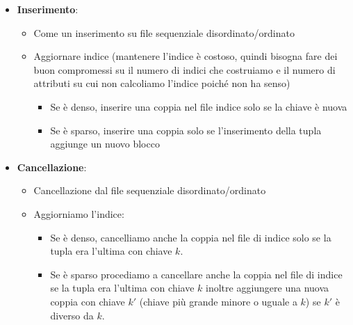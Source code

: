 \documentclass[a4paper]{article}
\begin{document}
\begin{itemize}
\begin{itemize}
\begin{itemize}
            o uguale alla chiave $k$ che sto cercando
            \item A questo punto seguo il puntatore $p_k$ per accedere al blocco.
            In questo caso il costo dell'operazione è:
            \[
                \text{costo = un accesso all'indice +
            un accesso al blocco dei dati. }
            \]
        \end{itemize}
        \item \textbf{Inserimento}:
        \begin{itemize}
            \item Come un inserimento su file sequenziale disordinato/ordinato
            \item Aggiornare indice (mantenere l'indice è costoso, quindi
            bisogna fare dei buon compromessi su il numero di indici che costruiamo
            e il numero di attributi su cui non calcoliamo l'indice poiché
            non ha senso)
            \begin{itemize}
                \item Se è denso, inserire una coppia nel file indice solo se la chiave
                è nuova
                \item Se è sparso, inserire una coppia solo se l'inserimento della
                tupla aggiunge un nuovo blocco
            \end{itemize}
        \end{itemize}
        \item \textbf{Cancellazione}:
        \begin{itemize}
            \item Cancellazione dal file sequenziale disordinato/ordinato
            \item Aggiorniamo l'indice:
            \begin{itemize}
                \item Se è denso, cancelliamo anche la coppia
                nel file di indice solo se la tupla era l'ultima con chiave $k$.
                \item Se è sparso procediamo a cancellare anche la coppia nel file
                di indice se la tupla era l'ultima con chiave $k$
                inoltre aggiungere una nuova coppia con chiave $k'$ (chiave
                più grande minore o uguale a $k$) se $k'$ è diverso da $k$.
            \end{itemize}
        \end{itemize}
    \end{itemize}

\end{itemize}
\end{document}
